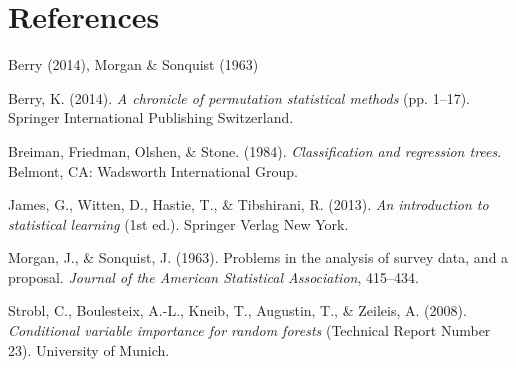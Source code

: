 \documentclass[12pt,twoside]{reedthesis}
\begin{document}
  \backmatter
  
  \chapter{References}\label{references}
  
  \noindent
  
  \setlength{\parindent}{-0.20in} \setlength{\leftskip}{0.20in}
  \setlength{\parskip}{8pt}
  
  Berry (2014), Morgan \& Sonquist (1963)
  
  \hypertarget{refs}{}
  \hypertarget{ref-berry}{}
  Berry, K. (2014). \emph{A chronicle of permutation statistical methods}
  (pp. 1--17). Springer International Publishing Switzerland.
  
  \hypertarget{ref-bibCART}{}
  Breiman, Friedman, Olshen, \& Stone. (1984). \emph{Classification and
  regression trees}. Belmont, CA: Wadsworth International Group.
  
  \hypertarget{ref-bibISL}{}
  James, G., Witten, D., Hastie, T., \& Tibshirani, R. (2013). \emph{An
  introduction to statistical learning} (1st ed.). Springer Verlag New
  York.
  
  \hypertarget{ref-morganSonquist}{}
  Morgan, J., \& Sonquist, J. (1963). Problems in the analysis of survey
  data, and a proposal. \emph{Journal of the American Statistical
  Association}, 415--434.
  
  \hypertarget{ref-bibstrobl2008}{}
  Strobl, C., Boulesteix, A.-L., Kneib, T., Augustin, T., \& Zeileis, A.
  (2008). \emph{Conditional variable importance for random forests}
  (Technical Report Number 23). University of Munich.


\end{document}

